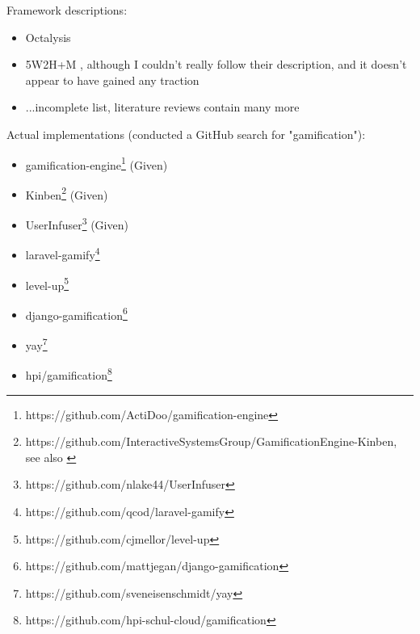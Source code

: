 \documentclass[runningheads]{llncs}
\begin{document}
Framework descriptions:

\begin{itemize}
    \item Octalysis \cite{Chou15}
    \item 5W2H+M \cite{CoGS19}, although I couldn't really follow their description, and it doesn't appear to have gained any traction
    \item ...incomplete list, literature reviews contain many more
\end{itemize}

Actual implementations (conducted a GitHub search for "gamification"):

\begin{itemize}
    \item gamification-engine\footnote{https://github.com/ActiDoo/gamification-engine} (Given)
    \item Kinben\footnote{https://github.com/InteractiveSystemsGroup/GamificationEngine-Kinben, see also \cite{KiKZ18}} (Given)
    \item UserInfuser\footnote{https://github.com/nlake44/UserInfuser} (Given)
    \item laravel-gamify\footnote{https://github.com/qcod/laravel-gamify}
    \item level-up\footnote{https://github.com/cjmellor/level-up}
    \item django-gamification\footnote{https://github.com/mattjegan/django-gamification}
    \item yay\footnote{https://github.com/sveneisenschmidt/yay}
    \item hpi/gamification\footnote{https://github.com/hpi-schul-cloud/gamification}
\end{itemize}

\printbibliography[]
\end{document}
